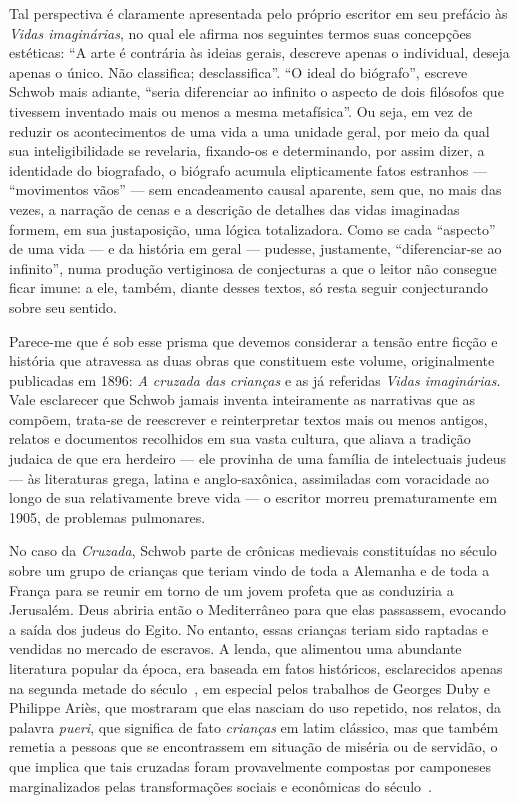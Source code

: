 Tal perspectiva é claramente apresentada pelo próprio escritor em seu prefácio
às \textit{Vidas imaginárias}, no qual ele afirma nos seguintes termos suas
concepções estéticas: “A arte é contrária às  ideias
gerais, descreve apenas o individual, deseja apenas o
único. Não classifica; desclassifica”.  “O ideal do biógrafo”, escreve
Schwob mais adiante, “seria diferenciar ao infinito o aspecto de dois filósofos
que tivessem inventado mais ou menos a mesma metafísica”.  Ou seja, em
vez de reduzir os acontecimentos de uma vida a uma unidade geral, por meio da
qual sua inteligibilidade se revelaria, fixando-os e determinando, por assim
dizer, a identidade do biografado, o biógrafo acumula elipticamente fatos
estranhos --- “movimentos vãos” --- sem encadeamento causal aparente, sem que, no
mais das vezes, a narração de cenas e a descrição de detalhes das vidas
imaginadas formem, em sua justaposição, uma lógica totalizadora. Como se cada
“aspecto” de uma vida --- e da história em geral --- pudesse, justamente,
“diferenciar-se ao infinito”, numa produção vertiginosa de conjecturas a que o
leitor não consegue ficar imune: a ele, também, diante desses textos, só resta
seguir conjecturando sobre seu sentido. 

Parece-me que é sob esse prisma que devemos considerar a tensão entre ficção e
história que atravessa as duas obras que constituem este volume, originalmente
publicadas em 1896: \textit{A cruzada das crianças} e as já referidas
\textit{Vidas imaginárias}. Vale esclarecer que Schwob jamais inventa
inteiramente as narrativas que as compõem, trata-se de reescrever e
reinterpretar textos mais ou menos antigos, relatos e documentos recolhidos em
sua vasta cultura, que aliava a tradição judaica de que era herdeiro --- ele
provinha de uma família de intelectuais judeus --- às literaturas grega, latina e
anglo-saxônica, assimiladas com voracidade ao longo de sua relativamente breve
vida --- o escritor morreu prematuramente em 1905, de problemas pulmonares. 

No caso da \textit{Cruzada}, Schwob parte de crônicas medievais constituídas no
século~ sobre um grupo de crianças que teriam vindo de toda a Alemanha e de
toda a França para se reunir em torno de um jovem profeta que as conduziria a
Jerusalém. Deus abriria então o Mediterrâneo para que elas passassem, evocando
a saída dos judeus do Egito. No entanto, essas crianças teriam sido raptadas e
vendidas no mercado de escravos. A lenda, que alimentou uma abundante
literatura popular da época, era baseada em fatos históricos, esclarecidos
apenas na segunda metade do século~, em especial pelos trabalhos de Georges
Duby e Philippe Ariès, que mostraram que elas nasciam do uso repetido, nos
relatos, da palavra \textit{pueri}, que significa de fato \textit{crianças} em
latim clássico, mas que também remetia a pessoas que se encontrassem em
situação de miséria ou de servidão, o que implica que tais cruzadas foram
provavelmente compostas por camponeses marginalizados pelas transformações
sociais e econômicas do século~. 

